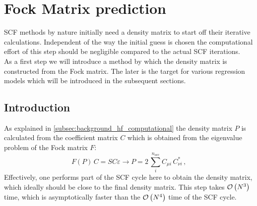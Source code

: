 \chapter{Fock Matrix prediction}
\label{chap:fock_matrix_predictions}

SCF methods by nature initially need a density matrix to start off their iterative calculations. Independent of the way the initial guess is chosen the computational effort of this step should be negligible compared to the actual SCF iterations.\\
As a first step we will introduce a method by which the density matrix is constructed from the Fock matrix. The later is the target for various regression models which will be introduced in the subsequent sections.


\section{Introduction}
\label{sec:Fock_mathcalrix_prediction_intro}
As explained in \autoref{subsec:background_hf_computational} the density matrix $P$ is calculated from the coefficient matrix $C$ which is obtained from the eigenvalue problem of the Fock matrix $F$:
\begin{equation}
    \label{eq:density_reconstruction_from_fock}
    F(P)\,C = SC\varepsilon \rightarrow P = 2\,\sum_{i}^{n_{occ}} C_{\mu i}\,C^*_{\nu i}\,,%
\end{equation}
Effectively, one performs part of the SCF cycle here to obtain the density matrix, which ideally should be close to the final density matrix. This step takes $\mathcal{O}\left(N^3\right)$ time, which is asymptotically faster than the $\mathcal{O}\left(N^4\right)$ time of the SCF cycle. 


